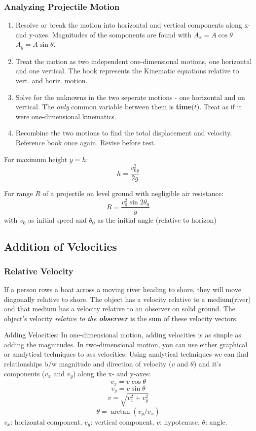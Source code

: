 \documentclass{article}
\begin{document}
\subsubsection{Analyzing Projectile Motion}
\begin{enumerate}
\item Resolve or break the motion into horizontal and vertical components along x- and y-axes. Magnitudes of the somponents are found with $A_x = A\cos \theta$ $A_y = A\sin \theta$.
  
\item Treat the motion as two independent one-dimensional motions, one horizontal and one vertical. The book represents the Kinematic equations relative to vert. and horiz. motion.
  
\item Solve for the unknowns in the two seperate motions - one horizontal and on vertical. The \emph{only} common variable between them is \textbf{time}($t$). Treat as if it were one-dimensional kinematics.
  
\item Recombine the two motions to find the total displacement and velocity. Reference book once again. Revise before test.
\end{enumerate}

For maximum height $y=h$: \[h = \frac{v^2_{0y}}{2g}\]

For range $R$ of a projectile on level ground with negligible air resistance: \[R = \frac{v_0^2 \sin 2 \theta _0}{g}\]
with $v_0$ as initial speed and $\theta _0$ as the initial angle (relative to horizon)

\subsection{Addition of Velocities}
\subsubsection{Relative Velocity}
If a person rows a boat across a moving river heading to shore, they will move diagonally relative to shore. The object has a velocity relative to a medium(river) and that medium has a velocity relative to an observer on solid ground. The object's velocity \emph{relative to the \textbf{observer}} is the sum of these velocity vectors.

Adding Velocities:
In one-dimensional motion, adding velocities is as simple as adding the magnitudes.
In two-dimensional motion, you can use either graphical or analytical techniques to ass velocities.
Using analytical techniques we can find relationships b/w magnitude and direction of velocity ($v$ and $\theta$) and it's components ($v_x$ and $v_y$) along the x- and y-axes:
\[ v_x = v \cos \theta\] \[v_y = v \sin \theta\] \[ v = \sqrt{v_x^2 + v_y^2} \] \[\theta = \arctan (v_y / v_x) \]
$v_x$: horizontal component, $v_y$: vertical component, $v$: hypotenuse, $\theta$: angle.
\end{document}
